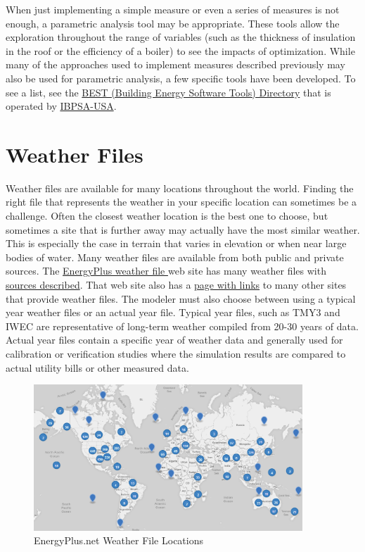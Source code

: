 When just implementing a simple measure or even a series of measures
is not enough, a parametric analysis tool may be appropriate. These
tools allow the exploration throughout the range of variables (such
as the thickness of insulation in the roof or the efficiency of a
boiler) to see the impacts of optimization. While many of the approaches
used to implement measures described previously may also be used for
parametric analysis, a few specific tools have been developed. To
see a list, see the \href{https://www.buildingenergysoftwaretools.com/}{BEST (Building Energy Software Tools) Directory}
that is operated by \href{https://www.ibpsa.us/}{IBPSA-USA}.

\section{Weather Files \label{subsec:Weather-Files}}

Weather files are available for many locations throughout the world.
Finding the right file that represents the weather in your specific
location can sometimes be a challenge. Often the closest weather location
is the best one to choose, but sometimes a site that is further away
may actually have the most similar weather. This is especially the
case in terrain that varies in elevation or when near large bodies
of water. Many weather files are available from both public and private
sources. The \href{https://energyplus.net/weather}{EnergyPlus weather file }
web site has many weather files with \href{https://energyplus.net/weather/sources}{sources described}.
That web site also has a \href{https://energyplus.net/weather/simulation}{page with links}
to many other sites that provide weather files. The modeler must also
choose between using a typical year weather files or an actual year
file. Typical year files, such as TMY3 and IWEC are representative
of long-term weather compiled from 20-30 years of data. Actual year
files contain a specific year of weather data and generally used for
calibration or verification studies where the simulation results are
compared to actual utility bills or other measured data.

\begin{figure}[hbtp]
\centering
\includegraphics[width=0.9\textwidth, height=0.9\textheight, keepaspectratio=true]{media/WeatherFileLocations.png}
\caption{EnergyPlus.net Weather File Locations}
\end{figure}

